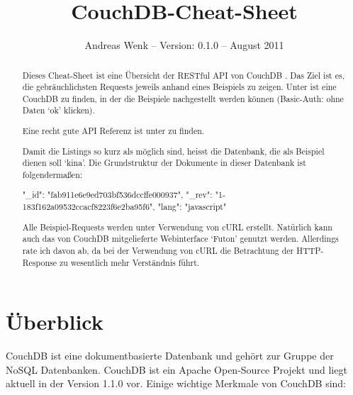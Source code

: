 \documentclass[19pt,landscape,twocolumn]{article}
\begin{document}
\fontsize{9}{10}\selectfont

\title{CouchDB-Cheat-Sheet}
\author{Andreas Wenk -- Version: 0.1.0 -- August 2011}
\date{}
\maketitle

\begin{abstract}
Dieses Cheat-Sheet ist eine Übersicht der RESTful API von CouchDB \cite{1}. Das Ziel ist es,
die gebräuchlichsten Requests jeweils anhand eines Beispiels zu zeigen. Unter \cite{2}
ist eine CouchDB zu finden, in der die Beispiele nachgestellt werden können (Basic-Auth: ohne 
Daten `ok' klicken). 

Eine recht gute API Referenz ist unter \cite{3} zu finden.

Damit die Listings so kurz als möglich sind, heisst die Datenbank, die als Beispiel dienen
soll `kina'. Die Grundstruktur der Dokumente in dieser Datenbank ist folgendermaßen:

\begin{code}
{
   "_id": "fab911e6e9ed703bf536dccffe000937",
   "_rev": "1-183f162a09532ccacf8223f6e2ba95f6",
   "lang": "javascript"
}
\end{code}

Alle Beispiel-Requests werden unter Verwendung von cURL \cite{10} erstellt. Natürlich kann auch das von 
CouchDB mitgelieferte Webinterface `Futon' genutzt werden. Allerdings rate ich davon ab, da 
bei der Verwendung von cURL die Betrachtung der HTTP-Response zu wesentlich mehr Verständnis führt.
\end{abstract}

\section{Überblick}

CouchDB ist eine dokumentbasierte Datenbank und gehört zur Gruppe der NoSQL Datenbanken. CouchDB
ist ein Apache Open-Source Projekt und liegt aktuell in der Version 1.1.0 vor. Einige wichtige 
Merkmale von CouchDB sind:
\end{document}
